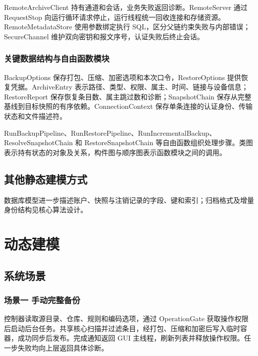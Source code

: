 RemoteArchiveClient 持有通道和会话，业务失败返回诊断。RemoteServer 通过 RequestStop 向运行循环请求停止，运行线程统一回收连接和存储资源。RemoteMetadataStore 使用参数绑定执行 SQL，区分父链约束失败与内部错误；SecureChannel 维护双向密钥和报文序号，认证失败后终止会话。

\subsubsection{关键数据结构与自由函数模块}
BackupOptions 保存打包、压缩、加密选项和本次口令，RestoreOptions 提供恢复凭据。ArchiveEntry 表示路径、类型、权限、属主、时间、链接与设备信息；RestoreReport 保存恢复条目数、属主跳过数和诊断；SnapshotChain 保存从完整基线到目标快照的有序依赖。ConnectionContext 保存单条连接的认证身份、传输状态和文件描述符。

RunBackupPipeline、RunRestorePipeline、RunIncrementalBackup、ResolveSnapshotChain 和 RestoreSnapshotChain 等自由函数组织处理步骤。类图表示持有状态的对象及关系，构件图与顺序图表示函数模块之间的调用。

\subsection{其他静态建模方式}
数据库模型进一步描述账户、快照与注销记录的字段、键和索引；归档格式及增量身份结构见核心算法设计。

\section{动态建模}
\subsection{系统场景}
\subsubsection{场景一 手动完整备份}
控制器读取源目录、仓库、规则和编码选项，通过 OperationGate 获取操作权限后启动后台任务。共享核心扫描并过滤条目，经打包、压缩和加密后写入临时容器，成功同步后发布。完成通知返回 GUI 主线程，刷新列表并释放操作权限。任一步失败均向上层返回具体诊断。

